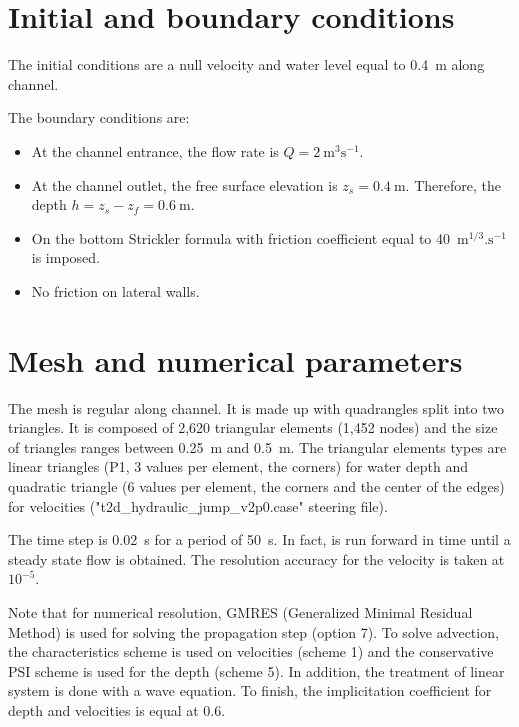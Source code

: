 \section{Initial and boundary conditions}
\bigskip
The initial conditions are a null velocity and water level 
equal to 0.4~m along channel.

\bigskip
The boundary conditions are:
\begin{itemize}
\item  At the channel entrance, the flow rate is $Q = 2~\text{m}^3\text{s}^{-1}$.
\item  At the channel outlet, the free surface elevation is 
$z_{s} = 0.4~\text{m}$. Therefore, the depth
$\displaystyle{h = z_{s}-z_{f} = 0.6~\text{m}}$.
\item On the bottom Strickler formula with friction coefficient 
equal to 40~$\text{m}^{1/3}.\text{s}^{-1}$ is imposed.
\item No friction on lateral walls.
\end{itemize}

\section{Mesh and numerical parameters}
\bigskip
The mesh is regular along channel. It is made up with 
quadrangles split into two triangles.
It is composed of 2,620 triangular elements (1,452 nodes) 
and the size of triangles ranges between 0.25~m and 0.5~m. 
The triangular elements types are linear triangles 
(P1, 3 values per element, the corners) for water depth and 
quadratic triangle (6 values per element, the corners and the center of the edges) 
for velocities ("t2d\_hydraulic\_jump\_v2p0.case" steering file).

\bigskip
The time step is 0.02~s for a period of 50~s. In fact,  is run forward in time until a steady state flow is obtained. The resolution accuracy for the velocity is taken at $10^{-5}$.

\bigskip
Note that for numerical resolution, GMRES (Generalized Minimal Residual Method) 
is used for solving the propagation step (option 7). To solve advection, 
the characteristics scheme is used on velocities (scheme 1) and 
the conservative PSI scheme is used for the depth (scheme 5). 
In addition, the treatment of linear system is done with a wave equation.
To finish, the implicitation coefficient for depth and velocities is equal at 0.6.

